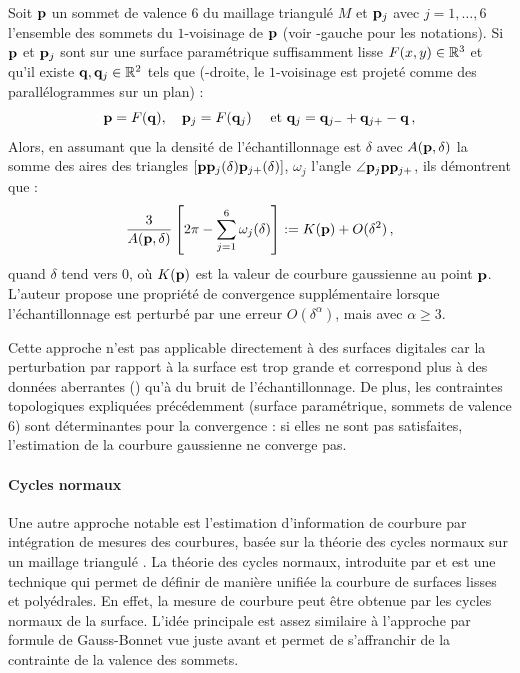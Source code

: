 Soit $\mathbf{p}$ un sommet de valence $6$ du maillage triangulé $M$ et $\mathbf{p}_j$ avec
$j = 1,\dotsc, 6$ l'ensemble des sommets du $1$-voisinage de $\mathbf{p}$ (voir
-gauche pour les notations). Si $\mathbf{p}$ et $\mathbf{p}_j$
sont sur une surface paramétrique suffisamment lisse $F(x,y) \in \mathbb{R}^3$ et
qu'il existe $\mathbf{q}, \mathbf{q}_j \in \mathbb{R}^2$ tels que
(-droite, le $1$-voisinage est projeté comme des
parallélogrammes sur un plan) :
%
\begin{equation}
  \mathbf{p}=F(\mathbf{q}), \quad \mathbf{p}_j=F(\mathbf{q}_j) \quad \text{~et~} \mathbf{q}_j=\mathbf{q}_{j-} + \mathbf{q}_{j+} - \mathbf{q} \,,
\end{equation}
%
Alors, en assumant que la densité de l’échantillonnage est $\delta$ avec $A(\mathbf{p}, \delta)$ la somme des aires des triangles
$[\mathbf{p}\mathbf{p}_j(\delta)\mathbf{p}_{j+}(\delta)]$, $\omega_j$ l'angle $\angle
\mathbf{p}_j\mathbf{p}\mathbf{p}_{j+}$, ils démontrent que :
%
\begin{equation}
  \frac{3}{A(\mathbf{p},\delta)} \left[ 2\pi - \sum \limits^6_{j=1} \omega_j(\delta) \right] := K(\mathbf{p}) + O(\delta^2) \,,
\end{equation}
%
quand $\delta$ tend vers $0$, où $K(\mathbf{p})$ est la valeur de courbure
gaussienne au point $\mathbf{p}$.
%
%
L'auteur propose une propriété de convergence supplémentaire lorsque
l'échantillonnage est perturbé par une erreur $O(\delta^\alpha)$, mais avec
$\alpha \ge 3$.


Cette approche n'est pas applicable directement à des surfaces digitales car la
perturbation par rapport à la surface est trop grande et
correspond plus à des données aberrantes () qu'à du bruit de l'échantillonnage. De
plus, les contraintes topologiques expliquées précédemment (surface
paramétrique, sommets de valence $6$) sont déterminantes pour la convergence :
si elles ne sont pas satisfaites, l'estimation de la courbure gaussienne ne
converge pas.
%
\paragraph{Cycles normaux}
%
Une autre approche notable est l'estimation d'information de courbure par
intégration de mesures des courbures, basée sur la théorie des cycles normaux sur
un maillage triangulé \cite{CohenSteiner2003,CohenSteiner2006}.
%
%
La théorie des cycles normaux, introduite par  et
 est une technique qui permet de définir de manière
unifiée la courbure de surfaces lisses et polyédrales. En effet, la mesure de
courbure peut être obtenue par les cycles normaux de la surface. L'idée
principale est assez similaire à l'approche par formule de Gauss-Bonnet
vue juste avant et permet de s'affranchir de la contrainte de la valence des
sommets.


